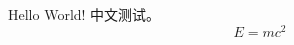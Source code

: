 \documentclass{article}
\begin{document}
Hello World! 中文测试。
\begin{equation}
  E = mc^{2}
\end{equation}
\end{document}
